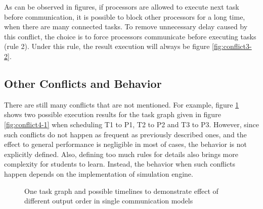 \documentclass[msc,deptreport, cs]{infthesis}
\begin{document}
As can be observed in figures, if processors are allowed to execute next task before communication, it is possible to block other processors for a long time, when there are many connected tasks. To remove unnecessary delay caused by this conflict, the choice is to force processors communicate before executing tasks (rule 2). Under this rule, the result execution will always be figure \ref{fig:conflict3-2}.

\subsection{Other Conflicts and Behavior}

There are still many conflicts that are not mentioned. For example, figure \ref{fig:conflict4} shows two possible execution results for the task graph given in figure \ref{fig:conflict4-1} when scheduling T1 to P1, T2 to P2 and T3 to P3. However, since such conflicts do not happen as frequent as previously described ones, and the effect to general performance is negligible in most of cases, the behavior is not explicitly defined. Also, defining too much rules for details also brings more complexity for students to learn. Instead, the behavior when such conflicts happen depends on the implementation of simulation engine.

\begin{figure}[htpb]
  \centering
   \hspace{0.5em}
   \hspace{0.5em}
  \caption{One task graph and possible timelines to demonstrate effect of different output order in single communication models}
  \label{fig:conflict4}
\end{figure}
\end{document}
